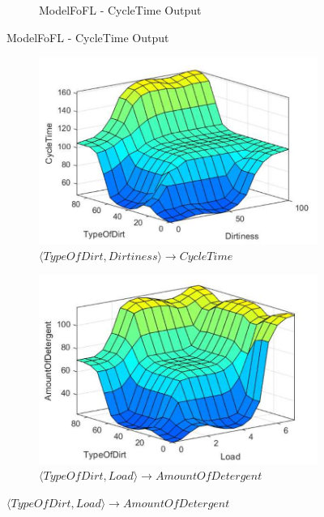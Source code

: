 \documentclass[11pt]{article}
\begin{document}
\begin{enumerate}[label=(\alph*)]
\begin{figure}[ht!]
\begin{subfigure}{.5\textwidth}
    \caption{ModelFoFL - CycleTime Output}
    \label{fig:sub2}
  \end{subfigure}
  \end{figure}

  \begin{figure}[ht!]
  \centering
  \begin{subfigure}{.5\textwidth}
    \centering
    \includegraphics[width=.9\linewidth]{res/image3_surface1}
    \caption{$\langle TypeOfDirt, Dirtiness \rangle \longrightarrow CycleTime$}
    \label{fig:sub1}
  \end{subfigure}%
  \begin{subfigure}{.5\textwidth}
    \centering
    \includegraphics[width=.9\linewidth]{res/image3_surface2}
    \caption{$\langle TypeOfDirt, Load \rangle \longrightarrow
      AmountOfDetergent$}
    \label{fig:sub2}
  \end{subfigure}
  \end{figure}

  \pagebreak


\end{enumerate}
\end{document}
